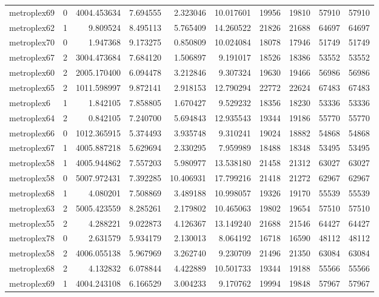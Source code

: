\begin{longtable}{|l|r|r|r|r|r|r|r|r|r|}
metroplex69 & 0 & 4004.453634 & 7.694555 & 2.323046 & 10.017601 & 19956 & 19810 & 57910 & 57910 \\
metroplex62 & 1 & 9.809524 & 8.495113 & 5.765409 & 14.260522 & 21826 & 21688 & 64697 & 64697 \\
metroplex70 & 0 & 1.947368 & 9.173275 & 0.850809 & 10.024084 & 18078 & 17946 & 51749 & 51749 \\
metroplex67 & 2 & 3004.473684 & 7.684120 & 1.506897 & 9.191017 & 18526 & 18386 & 53552 & 53552 \\
metroplex60 & 2 & 2005.170400 & 6.094478 & 3.212846 & 9.307324 & 19630 & 19466 & 56986 & 56986 \\
metroplex65 & 2 & 1011.598997 & 9.872141 & 2.918153 & 12.790294 & 22772 & 22624 & 67483 & 67483 \\
metroplex6 & 1 & 1.842105 & 7.858805 & 1.670427 & 9.529232 & 18356 & 18230 & 53336 & 53336 \\
metroplex64 & 2 & 0.842105 & 7.240700 & 5.694843 & 12.935543 & 19344 & 19186 & 55770 & 55770 \\
metroplex66 & 0 & 1012.365915 & 5.374493 & 3.935748 & 9.310241 & 19024 & 18882 & 54868 & 54868 \\
metroplex67 & 1 & 4005.887218 & 5.629694 & 2.330295 & 7.959989 & 18488 & 18348 & 53495 & 53495 \\
metroplex58 & 1 & 4005.944862 & 7.557203 & 5.980977 & 13.538180 & 21458 & 21312 & 63027 & 63027 \\
metroplex58 & 0 & 5007.972431 & 7.392285 & 10.406931 & 17.799216 & 21418 & 21272 & 62967 & 62967 \\
metroplex68 & 1 & 4.080201 & 7.508869 & 3.489188 & 10.998057 & 19326 & 19170 & 55539 & 55539 \\
metroplex63 & 2 & 5005.423559 & 8.285261 & 2.179802 & 10.465063 & 19802 & 19654 & 57510 & 57510 \\
metroplex55 & 2 & 4.288221 & 9.022873 & 4.126367 & 13.149240 & 21688 & 21546 & 64427 & 64427 \\
metroplex78 & 0 & 2.631579 & 5.934179 & 2.130013 & 8.064192 & 16718 & 16590 & 48112 & 48112 \\
metroplex58 & 2 & 4006.055138 & 5.967969 & 3.262740 & 9.230709 & 21496 & 21350 & 63084 & 63084 \\
metroplex68 & 2 & 4.132832 & 6.078844 & 4.422889 & 10.501733 & 19344 & 19188 & 55566 & 55566 \\
metroplex69 & 1 & 4004.243108 & 6.166529 & 3.004233 & 9.170762 & 19994 & 19848 & 57967 & 57967 \\

\end{longtable}
